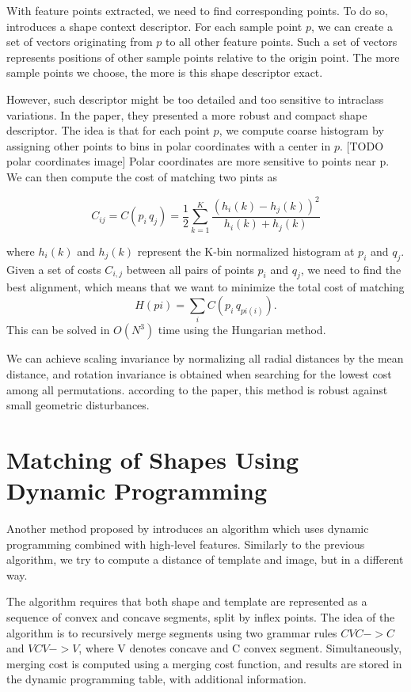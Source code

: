 With feature points extracted, we need to find corresponding points. To do so, \citet{simple} introduces a shape context descriptor. For each sample point $p$, we can create a set of vectors originating from $p$ to all other feature points. Such a set of vectors represents positions of other sample points relative to the origin point. The more sample points we choose, the more is this shape descriptor exact.

However, such descriptor might be too detailed and too sensitive to intraclass variations. In the paper, they presented a more robust and compact shape descriptor. The idea is that for each point $p$, we compute coarse histogram by assigning other points to bins in polar coordinates with a center in $p$. [TODO polar coordinates image] Polar coordinates are more sensitive to points near p. We can then compute the cost of matching two pints as 

\begin{equation*}
C_{ij} =  C(p_{i}\,q_{j}) = \frac{1}{2} \sum_{k=1}^{K} \frac{(h_{i}(k) - h_{j}(k))^2}{h_{i}(k) + h_{j}(k)}
\end{equation*}

where $ h_{i}(k) $ and $ h_{j}(k) $ represent the K-bin normalized histogram at $p_{i}$ and $q_{j}$. Given a set of costs $C_{i,j}$ between all pairs of points $p_{i}$ and $q_{j}$, we need to find the best alignment, which means that we want to minimize the total cost of matching 
\begin{equation*}
H(pi) = \sum_{i} C(p_{i}\,q_{pi(i)}).
\end{equation*}
This can be solved in $O(N^3)$ time using the Hungarian method\cite{simple}. 

We can achieve scaling invariance by normalizing all radial distances by the mean distance, and rotation invariance is obtained when searching for the lowest cost among all permutations. according to the paper, this method is robust against small geometric disturbances.

\section{Matching of Shapes Using Dynamic Programming}
Another method proposed by \citet{convex} introduces an algorithm which uses dynamic programming combined with high-level features. Similarly to the previous algorithm, we try to compute a distance of template and image, but in a different way.

The algorithm requires that both shape and template are represented as a sequence of convex and concave segments, split by inflex points. The idea of the algorithm is to recursively merge segments using two grammar rules $CVC -> C$ and $VCV -> V$, where V denotes concave and C convex segment. Simultaneously, merging cost is computed using a merging cost function, and results are stored in the dynamic programming table, with additional information.

